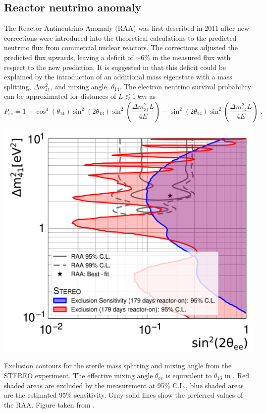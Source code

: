\subsection{Reactor neutrino anomaly}
The Reactor Antineutrino Anomaly (RAA) was first described in 2011 after new corrections were introduced into the theoretical calculations to the predicted neutrino flux from commercial nuclear reactors.
The corrections adjusted the predicted flux upwards, leaving a deficit of $\sim 6\%$ in the measured flux with respect to the new prediction.
It is suggested in \cite{Mention:2011rk} that this deficit could be explained by the introduction of an additional mass eigenstate with a mass splitting, $\Delta m^2_{41}$, and mixing angle, $\theta_{14}$.
The electron neutrino survival probability can be approximated for distances of $L\lesssim \SI{1}{km}$ as
\begin{equation}
    P_{ee} = 1 - \cos^4 (\theta_{14}) \sin^2 (2\theta_{13}) \sin^2 \left(\frac{\Delta m^2_{31} L}{4E} \right) - \sin^2 (2\theta_{14}) \sin^2 \left(\frac{\Delta m^2_{14} L}{4E} \right)\;.\label{eq:approx-Pee}
\end{equation}
\begin{marginfigure}
    \centering
    \includegraphics{figures/theory/ST_osc.pdf}
    \caption{Exclusion contours for the sterile mass splitting and mixing angle from the \textsc{STEREO} experiment. The effective mixing angle $\theta_{ee}$ is equivalent to $\theta_{13}$ in . Red shaded areas are excluded by the measurement at 95\% C.L., blue shaded areas are the estimated 95\% sensitivity. Gray solid lines show the preferred values of the RAA. Figure taken from \cite{Licciardi:2021hyi}.\label{fig:sterile-exclusions-stereo}}
\end{marginfigure}

